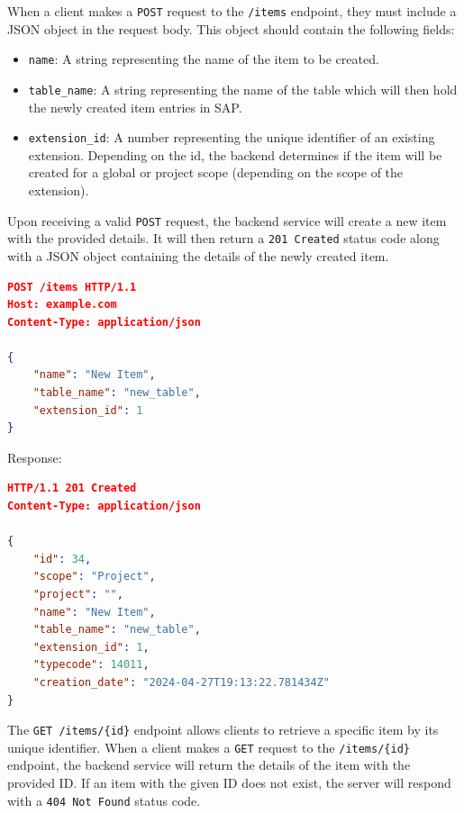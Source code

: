 
When a client makes a \texttt{POST} request to the \texttt{/items} endpoint, they must include a JSON object in the request body.
This object should contain the following fields:

\begin{itemize}
    \item \texttt{name}: A string representing the name of the item to be created.
    \item \texttt{table\_name}: A string representing the name of the table which will then hold the newly created item entries in SAP.
    \item \texttt{extension\_id}: A number representing the unique identifier of an existing extension.
    Depending on the id, the backend determines if the item will be created for a global or project scope (depending on the scope of the extension).
\end{itemize}

Upon receiving a valid \texttt{POST} request, the backend service will create a new item with the provided details.
It will then return a \texttt{201 Created} status code along with a JSON object containing the details of the newly created item.

\begin{lstlisting}[language=json,label={lst:lstlisting7}]
POST /items HTTP/1.1
Host: example.com
Content-Type: application/json

{
    "name": "New Item",
    "table_name": "new_table",
    "extension_id": 1
}
\end{lstlisting}

Response:

\begin{lstlisting}[language=json,label={lst:lstlisting8}]
HTTP/1.1 201 Created
Content-Type: application/json

{
    "id": 34,
    "scope": "Project",
    "project": "",
    "name": "New Item",
    "table_name": "new_table",
    "extension_id": 1,
    "typecode": 14011,
    "creation_date": "2024-04-27T19:13:22.781434Z"
}
\end{lstlisting}


The \texttt{GET /items/\{id\}} endpoint allows clients to retrieve a specific item by its unique identifier.
When a client makes a \texttt{GET} request to the \texttt{/items/\{id\}} endpoint, the backend service will return the details of the item with the provided ID. If an item with the given ID does not exist, the server will respond with a \texttt{404 Not Found} status code.

